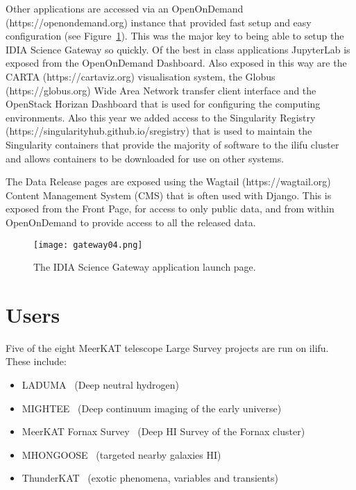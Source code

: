 \documentclass{iau_FM}
\begin{document}
Other applications are accessed via an OpenOnDemand (https://openondemand.org) instance that provided fast
setup and easy configuration (see Figure~\ref{fig:gateway-launch-page}). 
This was the major key to being able to setup the IDIA Science 
Gateway so quickly.
Of the best in class applications JupyterLab is exposed from the OpenOnDemand Dashboard. Also exposed in this
way are the CARTA (https://cartaviz.org) visualisation system, the Globus (https://globus.org)
Wide Area Network transfer client interface and the OpenStack Horizan
Dashboard that is used for configuring the computing environments. Also this year we added access
to the Singularity Registry (https://singularityhub.github.io/sregistry)
 that is used to maintain the Singularity 
containers that provide the majority of software to the {\sc ilifu} cluster and allows containers to be downloaded
for use on other systems.

The Data Release pages are exposed using the Wagtail (https://wagtail.org) Content Management System (CMS)
that is often used with Django. This is exposed from the Front Page, for access to only public data,
and from within OpenOnDemand to provide access to all the released data.




\begin{figure}
    \centering
    \texttt{[image: gateway04.png]}
    \label{fig:gateway-launch-page}
\caption{The IDIA Science Gateway application launch page.}
\end{figure}
    






\section{Users}
\label{sec:users}

Five of the eight MeerKAT telescope Large Survey projects are run on ilifu. 
These include:
\begin{itemize}
\item LADUMA~\cite{laduma} (Deep neutral hydrogen)
\item MIGHTEE~\cite{mightee} (Deep continuum imaging of the early universe)
\item MeerKAT Fornax Survey~\cite{formax} (Deep HI Survey of the Fornax cluster)
\item MHONGOOSE~\cite{mongoose} (targeted nearby galaxies HI)
\item ThunderKAT~\cite{thunderkat} (exotic phenomena, variables and transients)
\end{itemize}
\end{document}
